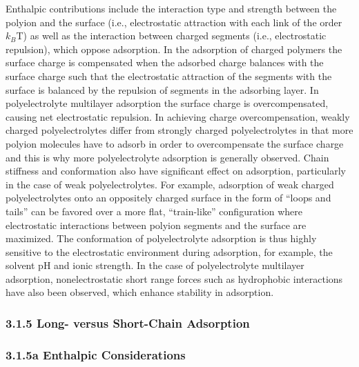 \documentclass[journal=mamobx,manuscript=article]{achemso}
\begin{document}
Enthalpic contributions include the interaction type and strength between the polyion and the surface (i.e., electrostatic attraction with each link of the order $k_B$T) as well as the interaction between charged segments (i.e., electrostatic repulsion), which oppose adsorption.\cite{Hoogeveen1996,VonGoeler1994}  In the adsorption of charged polymers the surface charge is compensated when the adsorbed charge balances with the surface charge such that the electrostatic attraction of the segments with the surface is balanced by the repulsion of segments in the adsorbing layer.  In polyelectrolyte multilayer adsorption the surface charge is overcompensated, causing net electrostatic repulsion.  In achieving charge overcompensation, weakly charged polyelectrolytes differ from strongly charged polyelectrolytes in that more polyion molecules have to adsorb in order to overcompensate the surface charge and this is why more polyelectrolyte adsorption is generally observed.  Chain stiffness and conformation also have significant effect on adsorption, particularly in the case of weak polyelectrolytes.\cite{Dzubiella2003}  For example, adsorption of weak charged polyelectrolytes onto an oppositely charged surface in the form of “loops and tails” can be favored over a more flat, “train-like” configuration where electrostatic interactions between polyion segments and the surface are maximized. \cite{Borisov1994}  The conformation of polyelectrolyte adsorption is thus highly sensitive to the electrostatic environment during adsorption, for example, the solvent pH and ionic strength.\cite{Notley2004}  In the case of polyelectrolyte multilayer adsorption, nonelectrostatic short range forces such as hydrophobic interactions have also been observed, which enhance stability in adsorption.\cite{Kotov1999}  


\subsubsection{3.1.5 Long- versus Short-Chain Adsorption }  %
  \label{sec-longvsshort}

\subsubsection{3.1.5a Enthalpic Considerations}  %
    \label{sec-enthalpic}
\end{document}
